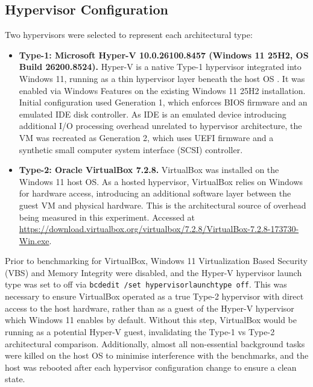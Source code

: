 \documentclass[a4paper, 12pt]{article}
\theoremstyle{plain}
\theoremstyle{definition}
\theoremstyle{remark}
\begin{document}
    \subsection{Hypervisor Configuration}

    Two hypervisors were selected to represent each architectural type:

    \begin{itemize}
        \item \textbf{Type-1: Microsoft Hyper-V 10.0.26100.8457 (Windows 11 25H2,
        OS Build 26200.8524).} Hyper-V is a native Type-1 hypervisor integrated
        into Windows 11, running as a thin hypervisor layer beneath the host OS
        \parencite{microsoftHyperVVirtualizationWindows}. It was enabled via Windows
        Features on the existing Windows 11 25H2 installation. Initial configuration
        used Generation 1, which enforces BIOS firmware and an emulated IDE disk
        controller. As IDE is an emulated device introducing additional I/O processing
        overhead unrelated to hypervisor architecture, the VM was recreated as
        Generation 2, which uses UEFI firmware and a synthetic small computer system interface (SCSI) controller.

        \item \textbf{Type-2: Oracle VirtualBox 7.2.8.} VirtualBox was installed
        on the Windows 11 host OS. As a hosted hypervisor, VirtualBox relies on
        Windows for hardware access, introducing an additional software layer
        between the guest VM and physical hardware. This is the architectural
        source of overhead being measured in this experiment. Accessed at \url{https://download.virtualbox.org/virtualbox/7.2.8/VirtualBox-7.2.8-173730-Win.exe}.
    \end{itemize}

    \noindent Prior to benchmarking for VirtualBox, Windows 11 Virtualization Based Security (VBS) and
    Memory Integrity were disabled, and the Hyper-V hypervisor launch type was
    set to off via \texttt{bcdedit /set hypervisorlaunchtype off}. This was
    necessary to ensure VirtualBox operated as a true Type-2 hypervisor with
    direct access to the host hardware, rather than as a guest of the Hyper-V
    hypervisor which Windows 11 enables by default. Without this step, VirtualBox 
    would be running as a potential Hyper-V guest, invalidating the Type-1 vs 
    Type-2 architectural comparison. Additionally, almost all non-essential background tasks were 
    killed on the host OS to minimise interference with the benchmarks, and the 
    host was rebooted after each hypervisor configuration change to ensure a clean state.
\end{document}

